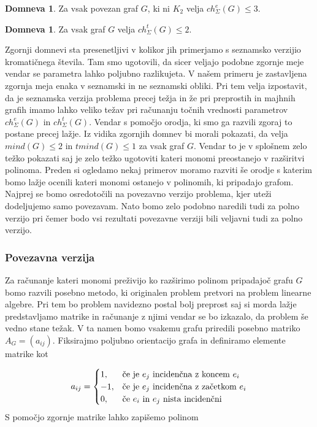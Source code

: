 \documentclass[12pt,a4paper,twoside]{article}
\theoremstyle{definition} %
\newtheorem{domneva}[definicija]{Domneva}
\theoremstyle{plain} %
\newcommand{\ecl}{ch_{\Sigma}^e}
\newcommand{\eclt}{ch_{\Sigma}^t}
\numberwithin{equation}{section}  %
\begin{document}
 \begin{domneva}
Za vsak povezan graf $G$, ki ni $K_2$ velja $\ecl(G) \le 3$.
\end{domneva}

 \begin{domneva}
Za vsak  graf $G$ velja $\eclt(G) \le 2$.
\end{domneva}
Zgornji domnevi sta presenetljivi v kolikor jih primerjamo s seznamsko verzijio kromatičnega števila. Tam smo ugotovili, da sicer veljajo podobne zgornje meje vendar se parametra lahko poljubno razlikujeta. V našem primeru je zastavljena zgornja meja enaka v seznamski in ne seznamski obliki. Pri tem velja izpostavit, da je seznamska verzija problema precej težja in že pri preprostih in majhnih grafih imamo lahko veliko težav pri računanju točnih vrednosti parametrov $\ecl(G)$ in $\eclt(G)$. Vendar s pomočjo orodja, ki smo ga razvili zgoraj to postane precej lažje. Iz vidika zgornjih domnev bi morali pokazati, da velja $mind(G) \le 2 $ in $tmind(G) \le 1$ za vsak graf $G$. Vendar to je v splošnem zelo težko pokazati saj je zelo težko ugotoviti kateri monomi preostanejo v razširitvi polinoma. Preden si ogledamo nekaj primerov moramo razviti še orodje s katerim bomo lažje ocenili kateri monomi ostanejo v polinomih, ki pripadajo grafom. Najprej se bomo osredotočili na povezavno verzijo problema, kjer uteži dodeljujemo samo povezavam. Nato bomo zelo podobno naredili tudi za polno verzijo pri čemer bodo vsi rezultati povezavne verziji bili veljavni tudi za polno verzijo.

\subsubsection{Povezavna verzija}
Za računanje kateri monomi preživijo ko razširimo polinom pripadajoč grafu $G$ bomo razvili posebno metodo, ki originalen problem pretvori na problem linearne algebre. Pri tem bo problem navidezno postal bolj preprost saj si morda lažje predstavljamo matrike in računanje z njimi vendar se bo izkazalo, da problem še vedno stane težak.
 V ta namen bomo vsakemu grafu priredili posebno matriko $A_G = (a_{ij})$. Fiksirajmo poljubno orientacijo grafa in definiramo elemente matrike kot 

\begin{equation*}
a_{ij} = 
\begin{cases}

1, & \text{če je $e_j$ incidenčna z koncem $e_i$}\\ 
	-1, & \text{če je $ e_j$ incidenčna z začetkom  $e_i$} \\

0, & \text{če $e_i$ in $e_j$ nista incidenčni}
\end{cases}
\end{equation*}
S pomočjo zgornje matrike lahko zapišemo polinom 
\end{document}
